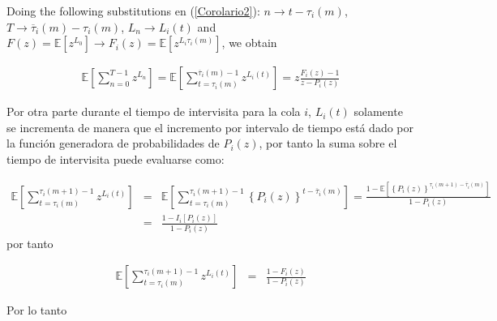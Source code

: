 \documentclass{article}
\newcommand{\esp}{\mathbb{E}}
\begin{document}
Doing the following substitutions en (\ref{Corolario2}): $n\rightarrow t-\tau_{i}\left(m\right)$, $T \rightarrow \overline{\tau}_{i}\left(m\right)-\tau_{i}\left(m\right)$, $L_{n}\rightarrow L_{i}\left(t\right)$ and $F\left(z\right)=\esp\left[z^{L_{0}}\right]\rightarrow F_{i}\left(z\right)=\esp\left[z^{L_{i}\tau_{i}\left(m\right)}\right]$, 
we obtain

\begin{eqnarray}\label{Eq.Arribos.Primera}
\esp\left[\sum_{n=0}^{T-1}z^{L_{n}}\right]=
\esp\left[\sum_{t=\tau_{i}\left(m\right)}^{\overline{\tau}_{i}\left(m\right)-1}z^{L_{i}\left(t\right)}\right]
=z\frac{F_{i}\left(z\right)-1}{z-P_{i}\left(z\right)}
\end{eqnarray}



Por otra parte durante el tiempo de intervisita para la cola $i$, $L_{i}\left(t\right)$ solamente se incrementa de manera que el incremento por intervalo de tiempo est\'a dado por la funci\'on generadora de probabilidades de $P_{i}\left(z\right)$, por tanto la suma sobre el tiempo de intervisita puede evaluarse como:

\begin{eqnarray*}
\esp\left[\sum_{t=\tau_{i}\left(m\right)}^{\tau_{i}\left(m+1\right)-1}z^{L_{i}\left(t\right)}\right]&=&\esp\left[\sum_{t=\tau_{i}\left(m\right)}^{\tau_{i}\left(m+1\right)-1}\left\{P_{i}\left(z\right)\right\}^{t-\overline{\tau}_{i}\left(m\right)}\right]=\frac{1-\esp\left[\left\{P_{i}\left(z\right)\right\}^{\tau_{i}\left(m+1\right)-\overline{\tau}_{i}\left(m\right)}\right]}{1-P_{i}\left(z\right)}\\
&=&\frac{1-I_{i}\left[P_{i}\left(z\right)\right]}{1-P_{i}\left(z\right)}
\end{eqnarray*}
por tanto

\begin{eqnarray*}
\esp\left[\sum_{t=\tau_{i}\left(m\right)}^{\tau_{i}\left(m+1\right)-1}z^{L_{i}\left(t\right)}\right]&=&
\frac{1-F_{i}\left(z\right)}{1-P_{i}\left(z\right)}
\end{eqnarray*}

Por lo tanto
\end{document}
